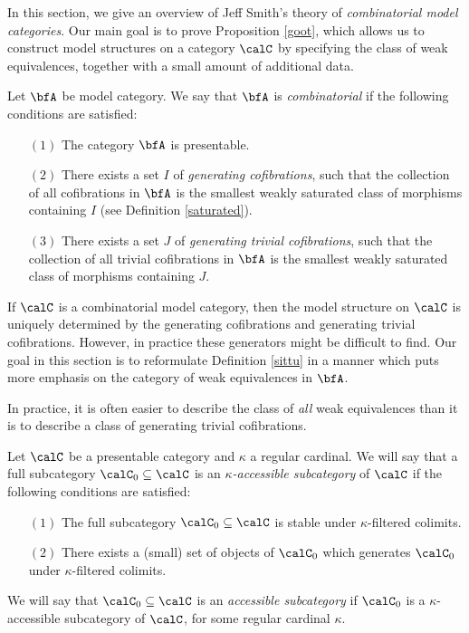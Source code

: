 In this section, we give an overview of Jeff Smith's theory of {\it combinatorial model categories}. Our main goal is to prove Proposition \ref{goot}, which allows us to construct model structures on a  
category $\calC$ by specifying the class of weak equivalences, together with a small amount of additional data.

\begin{definition}[Smith]\label{sittu}
Let $\bfA$ be model category. We say that $\bfA$ is {\it combinatorial} if the following conditions are satisfied:
\begin{itemize}
\item[$(1)$] The category $\bfA$ is presentable.
\item[$(2)$] There exists a set $I$ of {\it generating cofibrations}, such that the collection of all cofibrations in $\bfA$ is the smallest weakly saturated class of morphisms containing $I$ (see Definition \ref{saturated}). 
\item[$(3)$] There exists a set $J$ of {\it generating trivial cofibrations}, such that the collection of all trivial cofibrations in $\bfA$ is the smallest weakly saturated class of morphisms containing $J$.
\end{itemize}
\end{definition}

If $\calC$ is a combinatorial model category, then the model structure on $\calC$ is uniquely determined by the generating cofibrations and generating trivial cofibrations. However, in practice these generators might be difficult to find. Our goal in this section is to reformulate Definition \ref{sittu} in a manner which puts more emphasis on the category of weak equivalences in $\bfA$. 

In practice, it is often easier to describe the class of {\em all} weak equivalences than it is to describe a class of generating trivial cofibrations. 

\begin{definition}\label{kappar}
Let $\calC$ be a presentable category and $\kappa$ a regular cardinal. We will say that a full subcategory $\calC_0 \subseteq \calC$ is an {\it $\kappa$-accessible subcategory} of
$\calC$ if the following conditions are satisfied:
\begin{itemize}
\item[$(1)$] The full subcategory $\calC_0 \subseteq \calC$ is stable under $\kappa$-filtered colimits.
\item[$(2)$] There exists a (small) set of objects of $\calC_0$ which generates $\calC_0$ under $\kappa$-filtered colimits. 
\end{itemize}
We will say that $\calC_0 \subseteq \calC$ is an {\it accessible subcategory} if $\calC_0$ is a $\kappa$-accessible subcategory of $\calC$, for some regular cardinal $\kappa$.
\end{definition}

